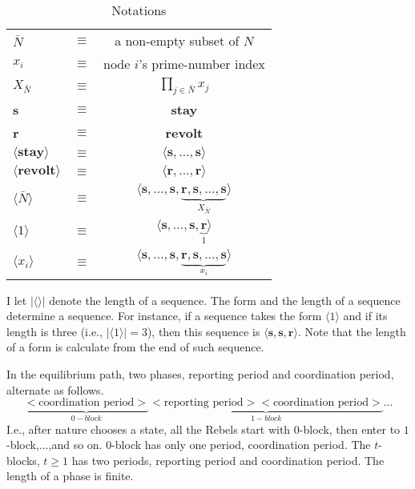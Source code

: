 \documentclass[12pt,letterpaper]{article}
\newtheorem*{main result}{Main Result}
\theoremstyle{definition}
\theoremstyle{remark}
\theoremstyle{claim}
\begin{document}
\begin{table}[t]
\caption{Notations}
\label{Table_msg_form}
\begin{center}
\begin{tabular}{l c c}
$\bar{N}$ 										& $\equiv$ 			& a non-empty subset of $N$  \\
$x_i$ 											& $\equiv$ 			& node $i$'s prime-number index  \\
$X_{\bar{N}}$ 								& $\equiv$ 			& $\prod_{j\in \bar{N}}x_j$  \\
\textbf{s}										& $\equiv$ 			& \textbf{stay}  \\
\textbf{r}										& $\equiv$ 			& \textbf{revolt}  \\
$\langle \textbf{stay} \rangle$ 		& $\equiv$ 			& $\langle \textbf{s},...,\textbf{s}\rangle$  \\
$\langle \textbf{revolt} \rangle$ 	& $\equiv$ 			& $\langle \textbf{r},...,\textbf{r}\rangle$  \\
$\langle  \bar{N} \rangle$ 				& $\equiv$ 			& $\langle \textbf{s},...,\textbf{s},\underbrace{\textbf{r},\textbf{s},...,\textbf{s}}_{X_{ \bar{N}}}\rangle$  \\

$\langle 1 \rangle$	 					& $\equiv$ 			& $\langle \textbf{s},...,\textbf{s},\underbrace{\textbf{r}}_{1}\rangle$  \\
$\langle x_i \rangle$	 	& $\equiv$ 			& $\langle \textbf{s},...,\textbf{s},\underbrace{\textbf{r},\textbf{s},...,\textbf{s}}_{x_i}\rangle$  \\
\end{tabular}
\end{center}
\end{table}

I let $|\langle\rangle|$ denote the length of a sequence. The form and the length of a sequence determine a sequence. For instance, if a sequence takes the form $\langle 1 \rangle$ and if its length is three (i.e., $|\langle 1 \rangle|=3$), then this sequence is $\langle \textbf{s},\textbf{s},\textbf{r}\rangle$. Note that the length of a form is calculate from the end of such sequence.

In the equilibrium path, two phases, {reporting period} and {coordination period}, alternate as follows.
\[\underbrace{<\text{coordination period}>}_{0-block}\underbrace{<\text{reporting period}><\text{coordination period}>}_{1-block}...\]
I.e., after nature chooses a state, all the Rebels start with $0$-block, then enter to $1$-block,...,and so on. $0$-block has only one period, coordination period. The $t$-blocks, $t\geq 1$ has two periods, reporting period and coordination period. The length of a phase is finite.
\end{document}
